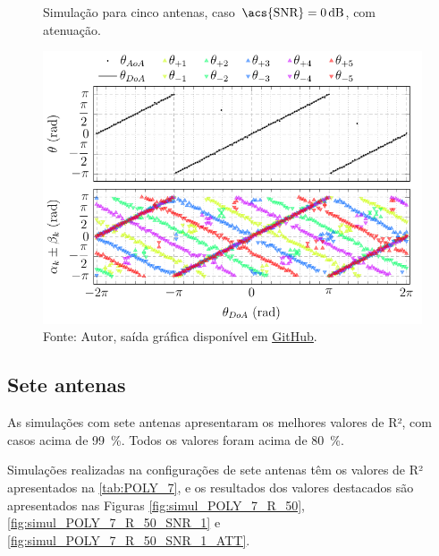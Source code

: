 \begin{figure}[H]
    \centering
    \caption{Simulação para cinco antenas, caso $\text{\acs{SNR}} = \SI{0}{\deci\bel}$, com atenuação.}
    \label{fig:simul_POLY_5_R_50_SNR_1_ATT}
    \includegraphics{../pictures/simul_POLY_5_R_50_SNR_1_ATT.pdf}
    \caption*{Fonte: Autor, saída gráfica disponível em \href{https://github.com/HeckRodSav/TG/blob/main/documentation/pictures/POLY_3/simul_POLY_5_R_50_SNR_1_ATT.gif}{\underline{GitHub}}.}
\end{figure}

\subsection{Sete antenas}

As simulações com sete antenas apresentaram os melhores valores de R², com casos acima de \qty{99}{\percent}.
Todos os valores foram acima de \qty{80}{\percent}.

Simulações realizadas na configurações de sete antenas têm os valores de R² apresentados na \autoref{tab:POLY_7}, e os resultados dos valores destacados são apresentados nas Figuras \ref{fig:simul_POLY_7_R_50}, \ref{fig:simul_POLY_7_R_50_SNR_1} e \ref{fig:simul_POLY_7_R_50_SNR_1_ATT}.

